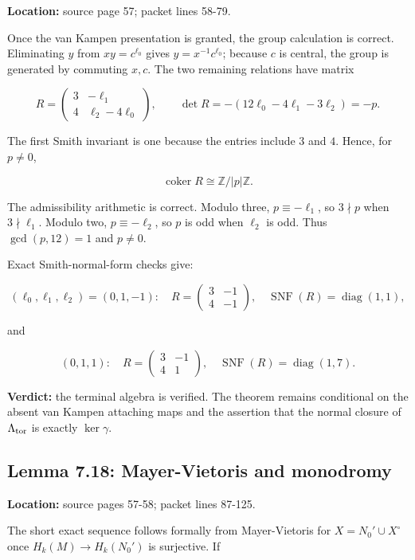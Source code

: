 \documentclass[
  10pt,
]{article}
\begin{document}
\textbf{Location:} source page 57; packet lines 58-79.

Once the van Kampen presentation is granted, the group calculation is
correct. Eliminating \(y\) from \(xy=c^{\ell_0}\) gives
\(y=x^{-1}c^{\ell_0}\); because \(c\) is central, the group is generated
by commuting \(x,c\). The two remaining relations have matrix

\[
R=\begin{pmatrix}
3&-\ell_1\\
4&\ell_2-4\ell_0
\end{pmatrix},
\qquad
\det R=-(12\ell_0-4\ell_1-3\ell_2)=-p.
\]

The first Smith invariant is one because the entries include \(3\) and
\(4\). Hence, for \(p\ne0\),

\[
\operatorname{coker}R\cong\mathbb Z/|p|\mathbb Z.
\]

The admissibility arithmetic is correct. Modulo three,
\(p\equiv-\ell_1\), so \(3\nmid p\) when \(3\nmid\ell_1\). Modulo two,
\(p\equiv-\ell_2\), so \(p\) is odd when \(\ell_2\) is odd. Thus
\(\gcd(p,12)=1\) and \(p\ne0\).

Exact Smith-normal-form checks give:

\[
(\ell_0,\ell_1,\ell_2)=(0,1,-1):\quad
R=\begin{pmatrix}3&-1\\4&-1\end{pmatrix},\quad
\operatorname{SNF}(R)=\operatorname{diag}(1,1),
\]

and

\[
(0,1,1):\quad
R=\begin{pmatrix}3&-1\\4&1\end{pmatrix},\quad
\operatorname{SNF}(R)=\operatorname{diag}(1,7).
\]

\textbf{Verdict:} the terminal algebra is verified. The theorem remains
conditional on the absent van Kampen attaching maps and the assertion
that the normal closure of \(\Lambda_{\rm tor}\) is exactly
\(\ker\gamma\).

\subsection{Lemma 7.18: Mayer-Vietoris and
monodromy}\label{lemma-7.18-mayer-vietoris-and-monodromy}

\textbf{Location:} source pages 57-58; packet lines 87-125.

The short exact sequence follows formally from Mayer-Vietoris for
\(X=N_0'\cup X^\circ\) once \(H_k(M)\to H_k(N_0')\) is surjective. If
\end{document}
